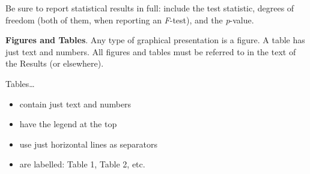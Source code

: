 \documentclass[
]{book}
\begin{document}
Be sure to report statistical results in full: include the test statistic, degrees of freedom (both of them, when reporting an \emph{F}-test), and the \emph{p}-value.

\textbf{Figures and Tables}. Any type of graphical presentation is a figure. A table has just text and numbers. All figures and tables must be referred to in the text of the Results (or elsewhere).

Tables\ldots{}

\begin{itemize}
\item
  contain just text and numbers
\item
  have the legend at the top
\item
  use just horizontal lines as separators
\item
  are labelled: Table 1, Table 2, etc.
\end{itemize}
\end{document}
